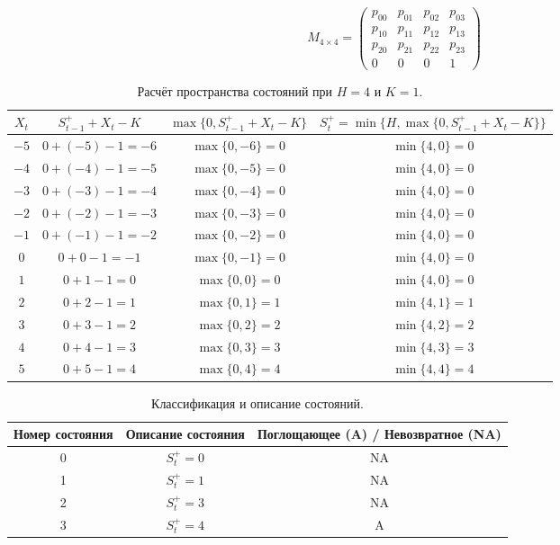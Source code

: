 \[
M_{4 \times 4} = \left( \begin{array}{ccc|c}
	p_{00} & p_{01} & p_{02} & p_{03} \\
	p_{10} & p_{11} & p_{12} & p_{13} \\
	p_{20} & p_{21} & p_{22} & p_{23} \\
	\hline
	0 & 0 & 0 & 1
\end{array} \right)
\]

\begin{table}[htbp]
	\centering
	\caption{Расчёт пространства состояний при \(H = 4\) и \(K = 1\).}
	\label{tab:3.9}
	\renewcommand{\arraystretch}{1.1}
	\begin{tabular}{cccc}
		\toprule
		\(X_t\) & \(S_{t-1}^{+} + X_t - K\) & \(\max\{0, S_{t-1}^{+} + X_t - K\}\) & \(S_t^+ = \min\{H, \max\{0, S_{t-1}^{+} + X_t - K\}\}\) \\
		\midrule
		\(-5\) & \(0 + (-5) - 1 = -6\) & \(\max\{0, -6\} = 0\) & \(\min\{4, 0\} = 0\) \\
		\(-4\) & \(0 + (-4) - 1 = -5\) & \(\max\{0, -5\} = 0\) & \(\min\{4, 0\} = 0\) \\
		\(-3\) & \(0 + (-3) - 1 = -4\) & \(\max\{0, -4\} = 0\) & \(\min\{4, 0\} = 0\) \\
		\(-2\) & \(0 + (-2) - 1 = -3\) & \(\max\{0, -3\} = 0\) & \(\min\{4, 0\} = 0\) \\
		\(-1\) & \(0 + (-1) - 1 = -2\) & \(\max\{0, -2\} = 0\) & \(\min\{4, 0\} = 0\) \\
		\(0\) & \(0 + 0 - 1 = -1\) & \(\max\{0, -1\} = 0\) & \(\min\{4, 0\} = 0\) \\
		\(1\) & \(0 + 1 - 1 = 0\) & \(\max\{0, 0\} = 0\) & \(\min\{4, 0\} = 0\) \\
		\(2\) & \(0 + 2 - 1 = 1\) & \(\max\{0, 1\} = 1\) & \(\min\{4, 1\} = 1\) \\
		\(3\) & \(0 + 3 - 1 = 2\) & \(\max\{0, 2\} = 2\) & \(\min\{4, 2\} = 2\) \\
		\(4\) & \(0 + 4 - 1 = 3\) & \(\max\{0, 3\} = 3\) & \(\min\{4, 3\} = 3\) \\
		\(5\) & \(0 + 5 - 1 = 4\) & \(\max\{0, 4\} = 4\) & \(\min\{4, 4\} = 4\) \\
		\bottomrule
	\end{tabular}
\end{table}

\begin{table}[htbp]
	\centering
	\caption{Классификация и описание состояний.}
	\label{tab:3.10}
	\renewcommand{\arraystretch}{1.1}
	\begin{tabular}{ccc}
		\toprule
		Номер состояния & Описание состояния & Поглощающее (A) / Невозвратное (NA) \\
		\midrule
		0 & \(S_t^+ = 0\) & NA \\
		1 & \(S_t^+ = 1\) & NA \\
		2 & \(S_t^+ = 3\) & NA \\
		3 & \(S_t^+ = 4\) & A \\
		\bottomrule
	\end{tabular}
\end{table}

